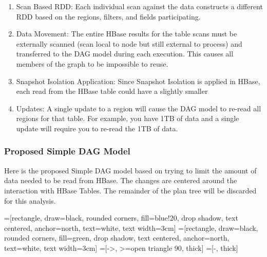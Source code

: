 \begin{enumerate}
	\item Scan Based RDD: Each individual scan against the data constructs a
	different RDD based on the regions, filters, and fields participating.
	\item Data Movement: The entire HBase results for the table scans must be
	externally scanned (scan local to node but still external to process) and
	transferred to the DAG model during each execution.  This causes all members of
	the graph to be impossible to reuse.
	\item Snapshot Isolation Application: Since Snapshot Isolation is applied in
	HBase, each read from the HBase table could have a slightly smaller 
	\item Updates:  A single update to a region will cause the DAG model to re-read
	all regions for that table.  For example, you have 1TB of data and a single
	update will require you to re-read the 1TB of data.
\end{enumerate}

\subsubsection{Proposed Simple DAG Model}
Here is the proposed Simple DAG model based on trying to limit the amount of
data needed to be read from HBase.  The changes are centered around the
interaction with HBase Tables.  The remainder of the plan tree will be discarded
for this analysis.

=[rectangle, draw=black, rounded corners, fill=blue!20, drop shadow, text centered, anchor=north, text=white, text width=3cm]
=[rectangle, draw=black, rounded corners, fill=green, drop shadow,
        text centered, anchor=north, text=white, text width=3cm]
=[->, >=open triangle 90, thick]
=[-, thick]
        
\begin{center}
\end{center}

